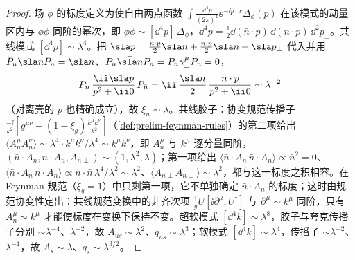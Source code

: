 \begin{proof}
场 $\phi$ 的标度定义为使自由两点函数 $\int\frac{\dd^4p}{(2\pi)^4}\ee^{-\ii p\cdot x}\Delta_\phi(p)$ 在该模式的动量区内与 $\phi\phi$ 同阶的幂次，即 $\phi\phi\sim[\dd^4p]\,\Delta_\phi$，$\dd^4p=\frac12\dd(\bar n\cdot p)\,\dd(n\cdot p)\,\dd^2p_\perp$。共线模式 $[\dd^4p]\sim\lambda^4$。把 $\sla p=\frac{\bar n\cdot p}{2}\sla n+\frac{n\cdot p}{2}\bar{\sla n}+\sla p_\perp$ 代入并用 $P_n\sla nP_{\bar n}=\sla n$、$P_n\bar{\sla n}P_{\bar n}=P_n\gamma_\perp^\mu P_{\bar n}=0$，
\begin{equation}\label{eq:scet-xiprop}
P_n\,\frac{\ii\sla p}{p^2+\ii0}\,P_{\bar n}=\ii\,\frac{\sla n}{2}\,\frac{\bar n\cdot p}{p^2+\ii0}\sim\lambda^{-2}
\end{equation}
（对离壳的 $p$ 也精确成立），故 $\xi_n\sim\lambda$。共线胶子：协变规范传播子 $\frac{-\ii}{k^2}[g^{\mu\nu}-(1-\xi_g)\frac{k^\mu k^\nu}{k^2}]$（\cref{def:prelim-feynman-rules}）的第二项给出 $\langle A_n^\mu A_n^\nu\rangle\sim\lambda^4\cdot k^\mu k^\nu/\lambda^4\sim k^\mu k^\nu$，即 $A_n^\mu$ 与 $k^\mu$ 逐分量同阶，$(\bar n\cdot A_n,n\cdot A_n,A_{n\perp})\sim(1,\lambda^2,\lambda)$；第一项给出 $\langle\bar n\cdot A_n\,\bar n\cdot A_n\rangle\propto\bar n^2=0$、$\langle\bar n\cdot A_n\,n\cdot A_n\rangle\propto n\cdot\bar n\,\lambda^4/\lambda^2\sim\lambda^2$、$\langle A_{n\perp}A_{n\perp}\rangle\sim\lambda^2$，都与这一标度之积相容。在 Feynman 规范（$\xi_g=1$）中只剩第一项，它不单独确定 $\bar n\cdot A_n$ 的标度；这时由规范协变性定出：共线规范变换中的非齐次项 $\frac1gU[\ii\partial^\mu,U^\dagger]$ 与 $\partial^\mu\sim k^\mu$ 同阶，只有 $A_n^\mu\sim k^\mu$ 才能使标度在变换下保持不变。超软模式 $[\dd^4k]\sim\lambda^8$，胶子与夸克传播子分别 $\sim\lambda^{-4}$、$\lambda^{-2}$，故 $A_{us}\sim\lambda^2$、$q_{us}\sim\lambda^3$；软模式 $[\dd^4k]\sim\lambda^4$，传播子 $\sim\lambda^{-2}$、$\lambda^{-1}$，故 $A_s\sim\lambda$、$q_s\sim\lambda^{3/2}$。
\end{proof}

